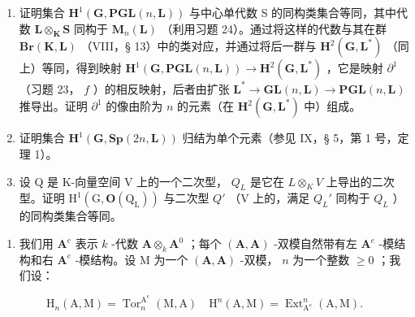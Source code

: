 \begin{enumerate}
\def\labelenumi{\alph{enumi})}
\setcounter{enumi}{1}
\item
  证明集合 \(\mathbf{H}^{1}(\mathbf{G},\mathbf{PGL}(n,\mathbf{L}))\) 与中心单代数 S 的同构类集合等同，其中代数 \(\mathbf{L}\otimes_{\mathbf{K}}\mathbf{S}\) 同构于 \(\mathbf{M}_{n}(\mathbf{L})\) （利用习题 24）。通过将这样的代数与其在群 \(\mathbf{Br}(\mathbf{K},\mathbf{L})\) （VIII，§ 13）中的类对应，并通过将后一群与 \(\mathbf{H}^{2}(\mathbf{G},\mathbf{L}^{*})\) （同上）等同，得到映射 \(\mathbf{H}^{1}(\mathbf{G},\mathbf{PGL}(n,\mathbf{L}))\to \mathbf{H}^{2}(\mathbf{G},\mathbf{L}^{*})\) ，它是映射 \(\partial^{1}\) （习题 23， \(f\) ）的相反映射，后者由扩张 \(\mathbf{L}^{*}\to \mathbf{GL}(n,\mathbf{L})\to \mathbf{PGL}(n,\mathbf{L})\) 推导出。证明 \(\partial^{1}\) 的像由阶为 \(n\) 的元素（在 \(\mathbf{H}^{2}(\mathbf{G},\mathbf{L}^{*})\) 中）组成。
\item
  证明集合 \(\mathbf{H}^{1}(\mathbf{G},\mathbf{Sp}(2n,\mathbf{L}))\) 归结为单个元素（参见 IX，§ 5，第 1 号，定理 1）。
\item
  设 Q 是 K-向量空间 V 上的一个二次型， \(Q_{L}\) 是它在 \(L \otimes_{K} V\) 上导出的二次型。证明 \(\mathrm{H}^{1}(\mathrm{G}, \mathbf{O}(\mathrm{Q}_{\mathrm{L}}))\) 与二次型 \(Q'\) （V 上的，满足 \(Q_{L}'\) 同构于 \(Q_{L}\) ）的同构类集合等同。
\end{enumerate}

\begin{enumerate}
\def\labelenumi{\arabic{enumi})}
\setcounter{enumi}{25}
\tightlist
\item
  我们用 \(\mathbf{A}^e\) 表示 \(k\) -代数 \(\mathbf{A} \otimes_k \mathbf{A}^0\) ；每个 \((\mathbf{A}, \mathbf{A})\) -双模自然带有左 \(\mathbf{A}^e\) -模结构和右 \(\mathbf{A}^e\) -模结构。设 M 为一个 \((\mathbf{A}, \mathbf{A})\) -双模， \(n\) 为一个整数 \(\geqslant 0\) ；我们设：
\end{enumerate}

\[
\mathrm{H} _ {n} (\mathrm{A}, \mathrm{M}) = \operatorname{Tor} _ {n} ^ {\mathrm{A} ^ {e}} (\mathrm{M}, \mathrm{A}) \quad \mathrm{H} ^ {n} (\mathrm{A}, \mathrm{M}) = \operatorname{Ext} _ {\mathrm{A} ^ {e}} ^ {n} (\mathrm{A}, \mathrm{M}).
\]

